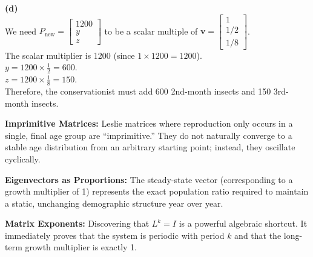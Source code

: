 \begin{solution}
\medskip
\textbf{(d)} \\
We need $P_{\text{new}} = \begin{bmatrix} 1200 \\ y \\ z \end{bmatrix}$ to be a scalar multiple of $\mathbf{v} = \begin{bmatrix} 1 \\ 1/2 \\ 1/8 \end{bmatrix}$. \\
The scalar multiplier is 1200 (since $1 \times 1200 = 1200$). \\
$y = 1200 \times \frac{1}{2} = 600$. \\
$z = 1200 \times \frac{1}{8} = 150$. \\
Therefore, the conservationist must add 600 2nd-month insects and 150 3rd-month insects.
\end{solution}

\begin{takeaways}
\item \textbf{Imprimitive Matrices:} Leslie matrices where reproduction only occurs in a single, final age group are ``imprimitive.'' They do not naturally converge to a stable age distribution from an arbitrary starting point; instead, they oscillate cyclically.
\item \textbf{Eigenvectors as Proportions:} The steady-state vector (corresponding to a growth multiplier of 1) represents the exact population ratio required to maintain a static, unchanging demographic structure year over year.
\item \textbf{Matrix Exponents:} Discovering that $L^k = I$ is a powerful algebraic shortcut. It immediately proves that the system is periodic with period $k$ and that the long-term growth multiplier is exactly 1.
\end{takeaways}
